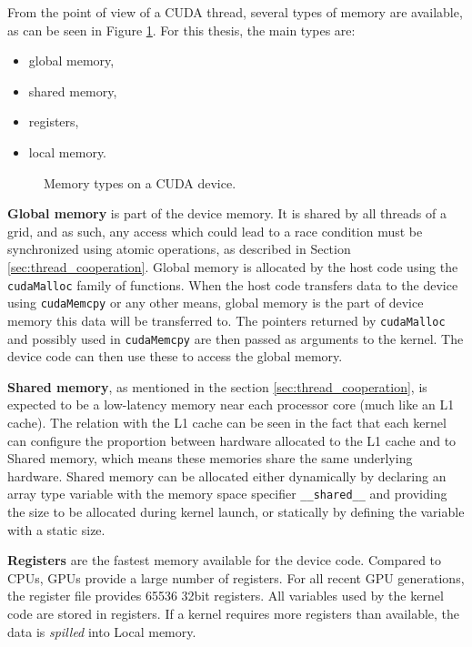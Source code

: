 From the point of view of a CUDA thread, several types of memory are available, as can be seen in Figure \ref{fig:memory_types}. For this thesis, the main types are:

\begin{itemize}
	\item global memory,
	\item shared memory,
	\item registers,
	\item local memory.
\end{itemize}

\begin{figure}[ht]
	\centering
	\def\svgwidth{\textwidth}
	\fontsize{6}{8}\selectfont
	
	\caption{Memory types on a CUDA device.}
	\label{fig:memory_types}
\end{figure}


\textbf{Global memory} is part of the device memory. It is shared by all threads of a grid, and as such, any access which could lead to a race condition must be synchronized using atomic operations, as described in Section \ref{sec:thread_cooperation}. Global memory is allocated by the host code using the \texttt{cudaMalloc} family of functions. When the host code transfers data to the device using \texttt{cudaMemcpy} or any other means, global memory is the part of device memory this data will be transferred to. The pointers returned by \texttt{cudaMalloc} and possibly used in \texttt{cudaMemcpy} are then passed as arguments to the kernel. The device code can then use these to access the global memory. 

\textbf{Shared memory}, as mentioned in the section \ref{sec:thread_cooperation}, is expected to be a low-latency memory near each processor core (much like an L1 cache). The relation with the L1 cache can be seen in the fact that each kernel can configure the proportion between hardware allocated to the L1 cache and to Shared memory, which means these memories share the same underlying hardware. Shared memory can be allocated either dynamically by declaring an array type variable with the memory space specifier \texttt{\_\_shared\_\_} and providing the size to be allocated during kernel launch, or statically by defining the variable with a static size.

\textbf{Registers} are the fastest memory available for the device code. Compared to CPUs, GPUs provide a large number of registers. For all recent GPU generations, the register file provides 65536 32bit registers. All variables used by the kernel code are stored in registers. If a kernel requires more registers than available, the data is \textit{spilled} into Local memory.

